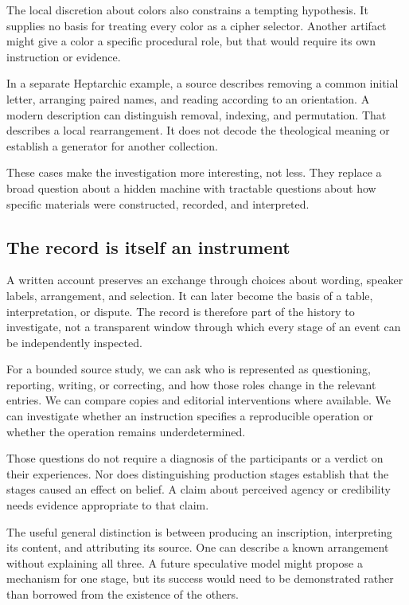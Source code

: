 \documentclass[11pt]{article}
\begin{document}
The local discretion about colors also constrains a tempting hypothesis.
It supplies no basis for treating every color as a cipher selector.
Another artifact might give a color a specific procedural role, but that
would require its own instruction or evidence.

In a separate Heptarchic example, a source describes removing a common
initial letter, arranging paired names, and reading according to an
orientation.\cite{heptarchia}
A modern description can distinguish removal, indexing, and permutation.
That describes a local rearrangement. It does not decode the theological
meaning or establish a generator for another collection.

These cases make the investigation more interesting, not less. They replace
a broad question about a hidden machine with tractable questions about how
specific materials were constructed, recorded, and interpreted.

\subsection{The record is itself an instrument}

A written account preserves an exchange through choices about wording,
speaker labels, arrangement, and selection. It can later become the basis
of a table, interpretation, or dispute. The record is therefore part of the
history to investigate, not a transparent window through which every stage
of an event can be independently inspected.

For a bounded source study, we can ask who is represented as questioning,
reporting, writing, or correcting, and how those roles change in the relevant
entries. We can compare copies and editorial interventions where available.
We can investigate whether an instruction specifies a reproducible operation
or whether the operation remains underdetermined.

Those questions do not require a diagnosis of the participants or a verdict
on their experiences. Nor does distinguishing production stages establish
that the stages caused an effect on belief. A claim about perceived agency
or credibility needs evidence appropriate to that claim.

The useful general distinction is between producing an inscription, interpreting
its content, and attributing its source. One can describe a known arrangement
without explaining all three. A future speculative model might propose a
mechanism for one stage, but its success would need to be demonstrated
rather than borrowed from the existence of the others.
\end{document}
